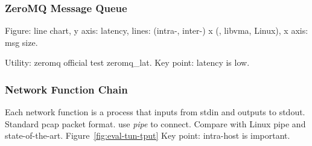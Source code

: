 


\subsubsection{ZeroMQ Message Queue}
\quad

Figure: line chart, y axis: latency, lines: (intra-, inter-) x (\sys{}, libvma, Linux), x axis: msg size.

Utility: zeromq official test zeromq\_lat.
Key point: latency is low.

\subsubsection{Network Function Chain}
\quad

Each network function is a process that inputs from stdin and outputs to stdout. Standard pcap packet format. use \emph{pipe} to connect. Compare with Linux pipe and state-of-the-art. Figure~\ref{fig:eval-tun-tput}
Key point: intra-host is important.


